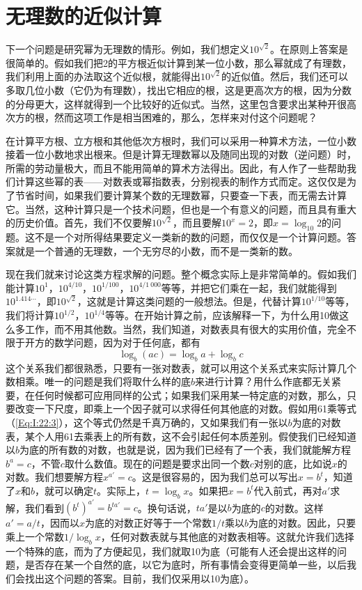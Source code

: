 \section{无理数的近似计算}

下一个问题是研究幂为无理数的情形。例如，我们想定义$10^{\sqrt{2}}$。在原则上答案是很简单的。假如我们把2的平方根近似计算到某一位小数，那么幂就成了有理数，我们利用上面的办法取这个近似根，就能得出$10^{\sqrt{2}}$的近似值。然后，我们还可以多取几位小数（它仍为有理数），找出它相应的根，这是更高次方的根，因为分数的分母更大，这样就得到一个比较好的近似式。当然，这里包含要求出某种开很高次方的根，然而这项工作是相当困难的，那么，怎样来对付这个问题呢？

在计算平方根、立方根和其他低次方根时，我们可以采用一种算术方法，一位小数接着一位小数地求出根来。但是计算无理数幂以及随同出现的对数（逆问题）时，所需的劳动量极大，而且不能用简单的算术方法得出。因此，有人作了一些帮助我们计算这些幂的表——对数表或幂指数表，分别视表的制作方式而定。这仅仅是为了节省时间，如果我们要计算某个数的无理数幂，只要查一下表，而无需去计算它。当然，这种计算只是一个技术问题，但也是一个有意义的问题，而且具有重大的历史价值。首先，我们不仅要解$10^{\sqrt{2}}$，而且要解$10^x=2$，即$x=\log_{10}2$的问题。这不是一个对所得结果要定义一类新的数的问题，而仅仅是一个计算问题。答案就是一个普通的无理数，一个无穷尽的小数，而不是一类新的数。

现在我们就来讨论这类方程求解的问题。整个概念实际上是非常简单的。假如我们能计算$10^1$，$10^{4/10}$，$10^{1/100}$，$10^{4/1~000}$等等，并把它们乘在一起，我们就能得到$10^{1.414\cdots}$，即$10^{\sqrt{2}}$，这就是计算这类问题的一般想法。但是，代替计算$10^{1/10}$等等，我们将计算$10^{1/2}$，$10^{1/4}$等等。在开始计算之前，应该解释一下，为什么用10做这么多工作，而不用其他数。当然，我们知道，对数表具有很大的实用价值，完全不限于开方的数学问题，因为对于任何底，都有
\begin{equation}
    \label{Eq:I:22:3}
    \log_b(ac)=\log_ba+\log_bc
\end{equation}
这个关系我们都很熟悉，只要有一张对数表，就可以用这个关系式来实际计算几个数相乘。唯一的问题是我们将取什么样的底$b$来进行计算？用什么作底都无关紧要，在任何时候都可应用同样的公式；如果我们采用某一特定底的对数，那么，只要改变一下尺度，即乘上一个因子就可以求得任何其他底的对数。假如用61乘等式（\ref{Eq:I:22:3}），这个等式仍然是千真万确的，又如果我们有一张以$b$为底的对数表，某个人用61去乘表上的所有数，这不会引起任何本质差别。假使我们已经知道以$b$为底的所有数的对数，也就是说，因为我们已经有了一个表，我们就能解方程$b^a=c$，不管$c$取什么数值。现在的问题是要求出同一个数$c$对别的底，比如说$x$的对数。我们想要解方程$x^{a'}=c$。这是很容易的，因为我们总可以写出$x=b^t$，知道了$x$和$b$，就可以确定$t$。实际上，$t=\log_bx$。如果把$x=b^t$代入前式，再对$a'$求解，我们看到$(b^{t})^{a'}=b^{ta'}=c$。换句话说，$t a'$是以$b$为底的$c$的对数。这样$a'=a/t$，因而以$x$为底的对数正好等于一个常数$1/t$乘以$b$为底的对数。因此，只要乘上一个常数$1/\log_bx$，任何对数表就与其他底的对数表相等。这就允许我们选择一个特殊的底，而为了方便起见，我们就取10为底（可能有人还会提出这样的问题，是否存在某一个自然的底，以它为底时，所有事情会变得更简单一些，以后我们会找出这个问题的答案。目前，我们仅采用以10为底）。

